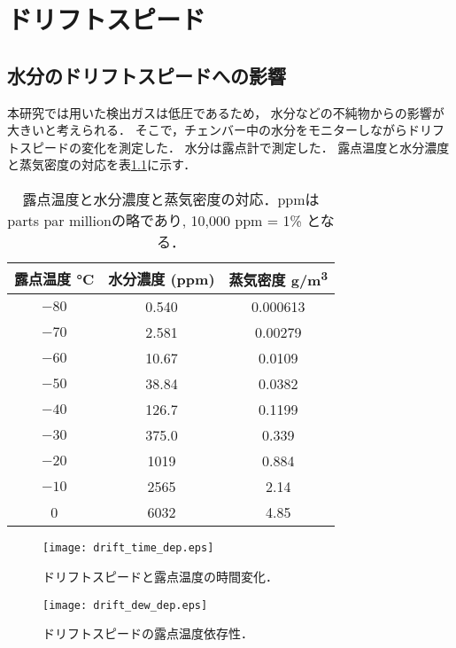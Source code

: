 \documentclass[../master]{subfiles}
\begin{document}
\chapter{ドリフトスピード}
\section{水分のドリフトスピードへの影響}
本研究では用いた検出ガスは低圧であるため，
水分などの不純物からの影響が大きいと考えられる．
そこで，チェンバー中の水分をモニターしながらドリフトスピードの変化を測定した．
水分は露点計で測定した．
露点温度と水分濃度と蒸気密度の対応を表\ref{tab::dew_point_humidity}に示す．
\begin{table}
  \centering
  \caption{露点温度と水分濃度と蒸気密度の対応．ppmはparts par millionの略であり, 10,000 ppm = 1\% となる．}
  \label{tab::dew_point_humidity}
  \begin{tabular}{ccc}
    \toprule
    露点温度 \si{\degreeCelsius} & 水分濃度 (ppm) & 蒸気密度 \si{\gram/\cubic\metre} \\
    \midrule
    $-80$ & 0.540 & 0.000613 \\
    $-70$ & 2.581 & 0.00279 \\
    $-60$ & 10.67 & 0.0109 \\
    $-50$ & 38.84 & 0.0382 \\
    $-40$ & 126.7 & 0.1199 \\
    $-30$ & 375.0 & 0.339 \\
    $-20$ & 1019 & 0.884 \\
    $-10$ & 2565 & 2.14 \\
    0     & 6032 & 4.85 \\
    \bottomrule
  \end{tabular}
\end{table}

\begin{figure}
  \centering
  \texttt{[image: drift\_time\_dep.eps]}
  \caption{ドリフトスピードと露点温度の時間変化．}
  \label{fig::drift_time_dep}
  \texttt{[image: drift\_dew\_dep.eps]}
  \caption{ドリフトスピードの露点温度依存性．}
  \label{fig::drift_dew_dep}
\end{figure}
\end{document}
